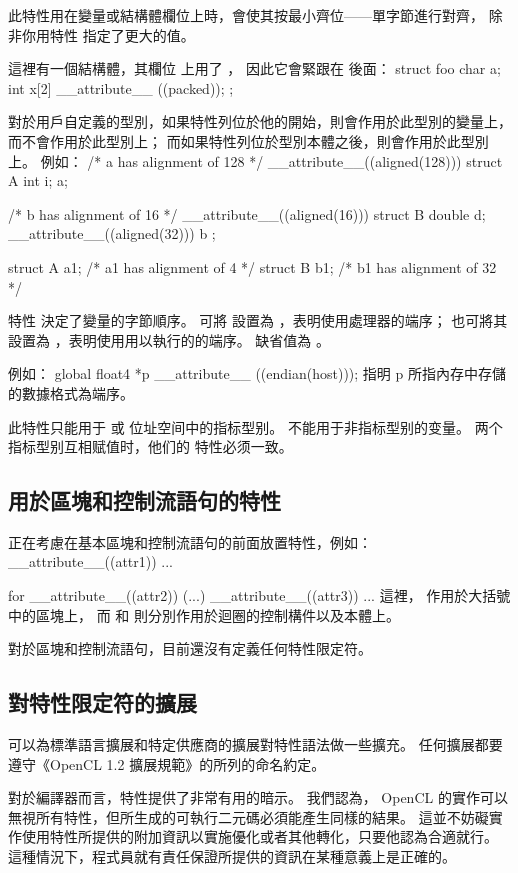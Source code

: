 此特性用在變量或結構體欄位上時，會使其按最小齊位——單字節進行對齊，
除非你用特性  指定了更大的值。

這裡有一個結構體，其欄位  上用了 ，
因此它會緊跟在  後面：
\startclc
struct foo
{
	char a;
	int x[2] __attribute__ ((packed));
};
\stopclc
\stopclOption

對於用戶自定義的型別，如果特性列位於他的開始，則會作用於此型別的變量上，而不會作用於此型別上；
而如果特性列位於型別本體之後，則會作用於此型別上。
例如：
\startclc
/* a has alignment of 128 */
__attribute__((aligned(128))) struct A {int i;} a;

/* b has alignment of 16 */
__attribute__((aligned(16))) struct B {double d;}
			__attribute__((aligned(32))) b ;

struct A a1;	/* a1 has alignment of 4 */
struct B b1;	/* b1 has alignment of 32 */
\stopclc

特性  決定了變量的字節順序。
可將  設置為 ，表明使用處理器的端序；
也可將其設置為 ，表明使用用以執行的的端序。
缺省值為 。

例如：
\startclc
global float4 *p __attribute__ ((endian(host)));
\stopclc
指明 p 所指內存中存儲的數據格式為端序。

此特性只能用于  或  位址空间中的指标型别。
不能用于非指标型别的变量。
两个指标型别互相赋值时，他们的  特性必须一致。
\stopclOption

\subsection{用於區塊和控制流語句的特性}

正在考慮在基本區塊和控制流語句的前面放置特性，例如：
\startclc
__attribute__((attr1)) {...}

for __attribute__((attr2)) (...) __attribute__((attr3)) {...}
\stopclc
這裡，  作用於大括號中的區塊上，
而  和  則分別作用於迴圈的控制構件以及本體上。

對於區塊和控制流語句，目前還沒有定義任何特性限定符。

\subsection{對特性限定符的擴展}

可以為標準語言擴展和特定供應商的擴展對特性語法做一些擴充。
任何擴展都要遵守《OpenCL 1.2 擴展規範》的{}所列的命名約定。

對於編譯器而言，特性提供了非常有用的暗示。
我們認為， OpenCL 的實作可以無視所有特性，但所生成的可執行二元碼必須能產生同樣的結果。
這並不妨礙實作使用特性所提供的附加資訊以實施優化或者其他轉化，只要他認為合適就行。
這種情況下，程式員就有責任保證所提供的資訊在某種意義上是正確的。


